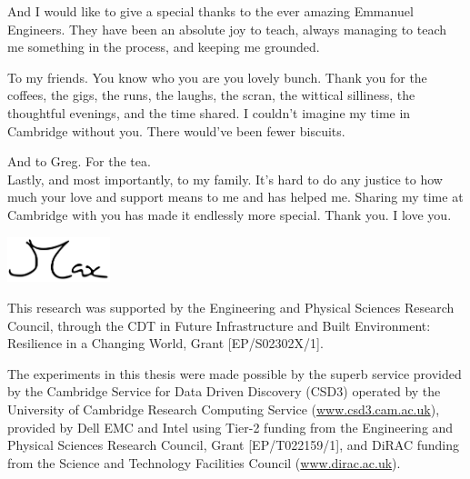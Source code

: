 \begin{acknowledgements}
    And I would like to give a special thanks to the ever amazing Emmanuel Engineers. They have been an absolute joy to teach, always managing to teach me something in the process, and keeping me grounded.

    To my friends. You know who you are you lovely bunch. Thank you for the coffees, the gigs, the runs, the laughs, the scran, the wittical silliness, the thoughtful evenings, and the time shared. I couldn't imagine my time in Cambridge without you. There would've been fewer biscuits.

    And to Greg. For the tea.\\

    Lastly, and most importantly, to my family. It's hard to do any justice to how much your love and support means to me and has helped me. Sharing my time at Cambridge with you has made it endlessly more special. Thank you. I love you.\\
    \vspace*{0.25cm}

    \hfill\includegraphics[width=3cm]{Figs/max.png}\hspace{1cm}

    \vfill

    This research was supported by the Engineering and Physical Sciences Research Council, through the CDT in Future Infrastructure and Built Environment: Resilience in a Changing World, Grant [EP/S02302X/1].

    The experiments in this thesis were made possible by the superb service provided by the Cambridge Service for Data Driven Discovery (CSD3) operated by the University of Cambridge Research Computing Service (\url{www.csd3.cam.ac.uk}), provided by Dell EMC and Intel using Tier-2 funding from the Engineering and Physical Sciences Research Council, Grant [EP/T022159/1], and DiRAC funding from the Science and Technology Facilities Council (\url{www.dirac.ac.uk}).

\end{acknowledgements}
